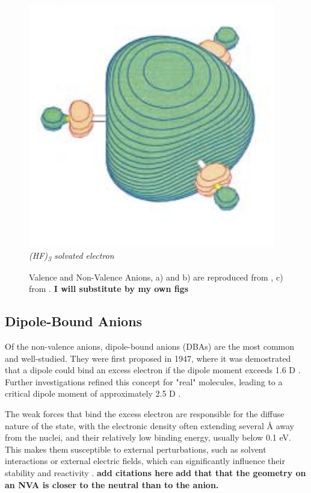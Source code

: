 \begin{figure}[h]
\begin{minipage}[b]{0.27\textwidth}
    \includegraphics[width=\textwidth]{chapters/introduction/image/hf3.png}
    \small\emph{(HF)\textsubscript{3} solvated electron}
  \end{minipage}
  \caption[Valence and Non-Valence Anions]{Valence and Non-Valence Anions, a) and b) are reproduced from \cite{dutta2015electron}, c) from \cite{jordan2003theory}. \textbf{I will substitute by my own figs}}
  \label{fig:AnionTypes}
\end{figure}

\subsection{Dipole-Bound Anions}
Of the non-valence anions, dipole-bound anions (DBAs) are the most common and well-studied. They were first proposed in 1947, where it was demostrated that a dipole could bind an excess electron if the dipole moment exceeds 1.6 D \cite{fermi1947capture}. Further investigations refined this concept for "real" molecules, leading to a critical dipole moment of approximately 2.5 D \cite{jordan2003theory}.

The weak forces that bind the excess electron are responsible for the diffuse nature of the state, with the electronic density often extending several Å away from the nuclei, and their relatively low binding energy, usually below 0.1 eV. This makes them susceptible to external perturbations, such as solvent interactions or external electric fields, which can significantly influence their stability and reactivity \cite{simons2008molecular,herbert2015quantum,jordan2003theory}. \textbf{add citations here}
\textbf{add that that the geometry on an NVA is closer to the neutral than to the anion.}

